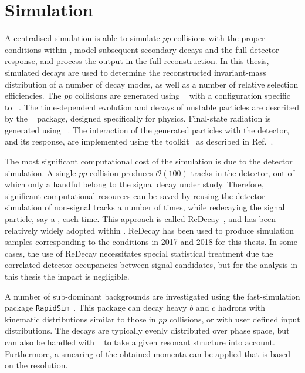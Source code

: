 



\section{Simulation} %
\label{sec:simulation}

A centralised \lhcb simulation is able to simulate $pp$ collisions with the proper conditions within \lhcb, model subsequent secondary decays and the full detector response, and process the output in the full \lhcb reconstruction. In this thesis, simulated decays are used to determine the reconstructed invariant-mass distribution of a number of decay modes, as well as a number of relative selection efficiencies. The $pp$ collisions are generated using \pythia~\cite{Sjostrand:2007gs,*Sjostrand:2006za} with a configuration specific to \lhcb~\cite{LHCb-PROC-2010-056}. The time-dependent evolution and decays of unstable particles are described by the \evtgen~\cite{EvtGen} package, designed specifically for \B physics. Final-state radiation is generated using \photos~\cite{Golonka:2005pn}. The interaction of the generated particles with the detector, and its response, are implemented using the \geant toolkit~\cite{Allison:2006ve, *Agostinelli:2002hh} as described in  Ref.~\cite{LHCb-PROC-2011-006}. 

The most significant computational cost of the simulation is due to the detector simulation. A single $pp$ collision produces $\mathcal O(100)$ tracks in the detector, out of which only a handful belong to the signal decay under study. Therefore, significant computational resources can be saved by reusing the detector simulation of non-signal tracks a number of times, while redecaying the signal particle, say a \Bp, each time. This approach is called ReDecay~\cite{LHCb-DP-2018-004}, and has been relatively widely adopted within \lhcb. ReDecay has been used to produce simulation samples corresponding to the conditions in 2017 and 2018 for this thesis. In some cases, the use of ReDecay necessitates special statistical treatment due the correlated detector occupancies between signal candidates, but for the analysis in this thesis the impact is negligible.

A number of sub-dominant backgrounds are investigated using the fast-simulation package \texttt{RapidSim}~\cite{cowanRapidSimApplicationFast2017}. This package can decay heavy $b$ and $c$ hadrons with kinematic distributions similar to those in \lhcb $pp$ collisions, or with user defined input distributions. The decays are typically evenly distributed over phase space, but can also be handled with \evtgen~\cite{EvtGen} to take a given resonant structure into account. Furthermore, a smearing of the obtained momenta can be applied that is based on the \lhcb resolution. 

